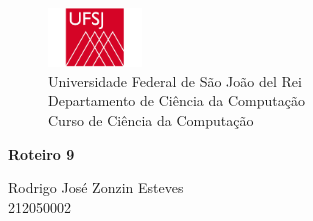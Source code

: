 \begin{figure}[t]
	\centering
	\includegraphics[width=2.5cm]{imagens/ufsj.jpg}\\
	
	{\large Universidade Federal de São João del Rei\\
		Departamento de Ciência da Computação\\
		Curso de Ciência da Computação\\}
	\label{fig:imagens/ufsj}
\end{figure}
{\Large
	\begin{center}
		\textbf{Roteiro 9}
		
	\end{center}
}

{\large 
	
	\begin{center}
		Rodrigo José Zonzin Esteves \\
		212050002
	\end{center}	
}